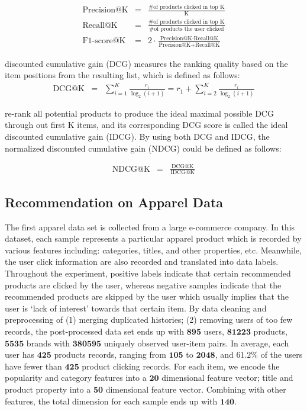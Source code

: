 \begin{eqnarray}
\text{Precision@K} & = & \frac{\text{\# of products clicked in top K}}{\text{K}} \nonumber \\
\text{Recall@K}      & = & \frac{\text{\# of products clicked in top K}}{\text{\# of products the user clicked}} \nonumber \\
\text{F1-score@K} & = & 2\cdot\frac{\text{Precision@K} \cdot \text{Recall@K}}{\text{Precision@K} + \text{Recall@K}}  \nonumber
\end{eqnarray}

discounted cumulative gain (DCG) measures the ranking quality based on the item positions from the resulting list, which is defined as follows:
\begin{eqnarray}
\text{DCG@K} & = & \sum_{i=1}^K\frac{r_i}{\log_2(i+1)} =  r_1 + \sum_{i=2}^K\frac{r_i}{\log_2(i+1)}\nonumber
\end{eqnarray}

re-rank all potential products to produce the ideal maximal possible DCG through out first K items, and its corresponding DCG score is called the ideal discounted cumulative gain (IDCG).  By using both DCG and IDCG, the normalized discounted cumulative gain (NDCG) could be defined as follows:

\begin{eqnarray}
\text{NDCG@K} & = & \frac{\text{DCG@K}}{\text{IDCG@K}}\nonumber
\end{eqnarray}

\subsection{Recommendation on Apparel Data}
The first apparel data set is collected from a large e-commerce company.  In this dataset, each sample represents a particular apparel product which is recorded by various features including: categories, titles, and other properties, etc.  Meanwhile, the user click information are also recorded and translated into data labels. Throughout the experiment, positive labels indicate that certain recommended products are clicked by the user, whereas negative samples indicate that the recommended products are skipped by the user which usually implies that the user is `lack of interest' towards that certain item.  By data cleaning and preprocessing of (1) merging duplicated histories; (2) removing users of too few records, the post-processed data set ends up with $\mathbf{895}$ users, $\mathbf{81223}$ products, $\mathbf{5535}$ brands with $\mathbf{380595}$ uniquely observed user-item pairs.  In average, each user has $\mathbf{425}$ products records, ranging from $\mathbf{105}$ to $\mathbf{2048}$, and $\mathbf{61.2\%}$ of the users have fewer than $\mathbf{425}$ product clicking records.  For each item, we encode the popularity and category features into a $\mathbf{20}$ dimensional feature vector; title and product property into a $\mathbf{50}$ dimensional feature vector.  Combining with other features, the total dimension for each sample ends up with $\mathbf{140}$.

